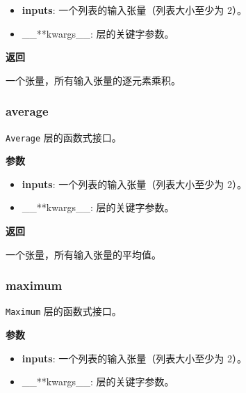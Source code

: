 \begin{itemize}
\tightlist
\item
  \textbf{inputs}: 一个列表的输入张量（列表大小至少为 2）。
\item
  \_\_**kwargs\_\_: 层的关键字参数。
\end{itemize}

\textbf{返回}

一个张量，所有输入张量的逐元素乘积。



\subsubsection{average}\label{average}

\begin{Shaded}
\begin{Highlighting}[]
\end{Highlighting}
\end{Shaded}

\texttt{Average} 层的函数式接口。

\textbf{参数}

\begin{itemize}
\tightlist
\item
  \textbf{inputs}: 一个列表的输入张量（列表大小至少为 2）。
\item
  \_\_**kwargs\_\_: 层的关键字参数。
\end{itemize}

\textbf{返回}

一个张量，所有输入张量的平均值。



\subsubsection{maximum}\label{maximum}

\begin{Shaded}
\begin{Highlighting}[]
\end{Highlighting}
\end{Shaded}

\texttt{Maximum} 层的函数式接口。

\textbf{参数}

\begin{itemize}
\tightlist
\item
  \textbf{inputs}: 一个列表的输入张量（列表大小至少为 2）。
\item
  \_\_**kwargs\_\_: 层的关键字参数。
\end{itemize}

